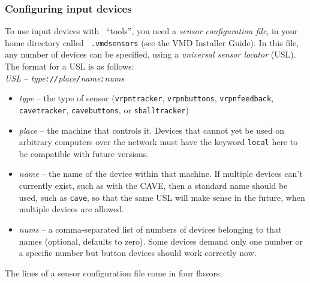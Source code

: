 \subsubsection{Configuring input devices}
To use input devices with \VMD\ ``tools'', you need a 
{\it sensor configuration file},
in your home directory called {\tt
.vmdsensors} (see the VMD Installer Guide).  
In this file, any number of devices
can be specified, using a {\sl universal sensor locator\/}
(USL).  
The format for a USL is as follows:
\\
{\it USL\/} -- {\it type{\tt ://}place{\tt /}name{\tt :}nums}
\begin{itemize}
  \item{\it type\/} -- the type of sensor
({\tt vrpntracker}, {\tt vrpnbuttons}, {\tt vrpnfeedback},
{\tt cavetracker}, {\tt cavebuttons}, or {\tt sballtracker})
  \item{\it place\/} -- the machine that controls it.  Devices that
    cannot yet be used on arbitrary computers over the network must
    have the keyword {\tt local} here to be compatible with future
    versions.
  \item{\it name\/} -- the name of the device within that machine.  If
    multiple devices can't currently exist, such as with the CAVE,
    then a standard name should be used, such as {\tt cave}, so that
    the same USL will make sense in the future, when multiple devices
    are allowed.
  \item{\it nums\/} -- a comma-separated list of numbers of devices
    belonging to that names (optional, defaults to zero).  Some
    devices demand only one number or a specific number but button
    devices should work correctly now.
\end{itemize}
The lines of a sensor configuration file come in four flavors:
